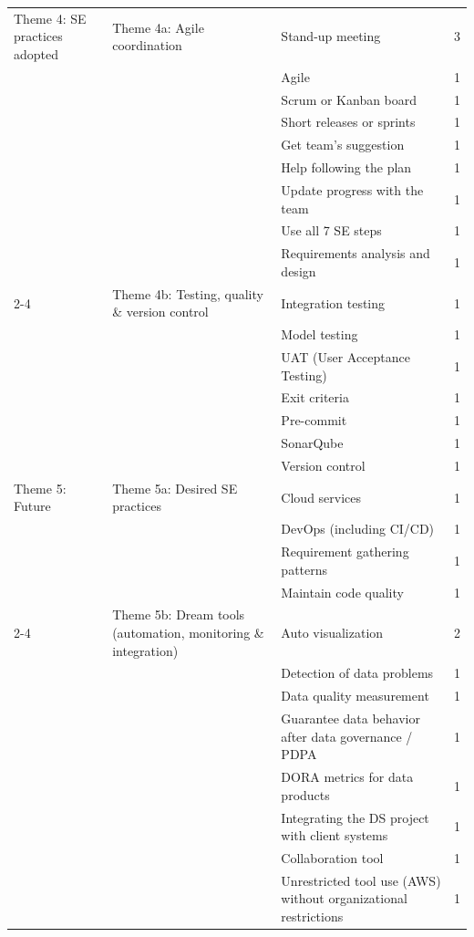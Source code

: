 \documentclass[11pt]{article}
\begin{document}
\begin{longtable}{@{}p{3.5cm} p{3.5cm} p{6.0cm} c@{}}
Theme 4: SE practices adopted
  & Theme 4a: Agile coordination
  & Stand-up meeting & 3 \\
   &
  & Agile & 1 \\
   &
  & Scrum or Kanban board & 1 \\
   &
  & Short releases or sprints & 1 \\
   &
  & Get team's suggestion & 1 \\
   &
  & Help following the plan & 1 \\
   &
  & Update progress with the team & 1 \\
   &
  & Use all 7 SE steps & 1 \\
   &
  & Requirements analysis and design & 1 \\
\cmidrule(lr){2-4}
  & Theme 4b: Testing, quality \& version control
  & Integration testing & 1 \\
   &
  & Model testing & 1 \\
   &
  & UAT (User Acceptance Testing) & 1 \\
   &
  & Exit criteria & 1 \\
   &
  & Pre-commit & 1 \\
   &
  & SonarQube & 1 \\
   &
  & Version control & 1 \\
\midrule

Theme 5: Future
  & Theme 5a: Desired SE practices
  & Cloud services & 1 \\
   &
  & DevOps (including CI/CD) & 1 \\
   &
  & Requirement gathering patterns & 1 \\
   &
  & Maintain code quality & 1 \\
\cmidrule(lr){2-4}
  & Theme 5b: Dream tools (automation, monitoring \& integration)
  & Auto visualization & 2 \\
   &
  & Detection of data problems & 1 \\
   &
  & Data quality measurement & 1 \\
   &
  & Guarantee data behavior after data governance / PDPA & 1 \\
   &
  & DORA metrics for data products & 1 \\
   &
  & Integrating the DS project with client systems & 1 \\
   &
  & Collaboration tool & 1 \\
   &
  & Unrestricted tool use (AWS) without organizational restrictions & 1 \\
\midrule


\end{longtable}
\end{document}
